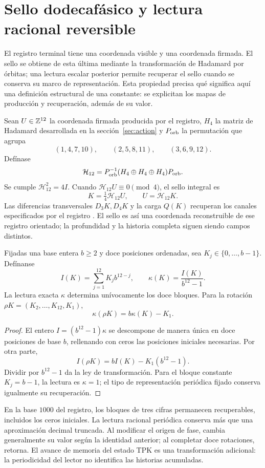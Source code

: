 \section{Sello dodecafásico y lectura racional reversible}
\label{sec:sello}

El registro terminal tiene una coordenada visible y una coordenada
firmada. El sello se obtiene de esta última mediante la transformación
de Hadamard por órbitas; una lectura escalar posterior permite recuperar
el sello cuando se conserva su marco de representación. Esta propiedad
precisa qué significa aquí una definición estructural de una constante:
se explicitan los mapas de producción y recuperación, además de su valor.

Sean $U\in\mathbb Z^{12}$ la coordenada firmada producida por el registro,
$H_4$ la matriz de Hadamard desarrollada en la sección~\ref{sec:action}
y $P_{\rm orb}$ la permutación que agrupa
\[
 (1,4,7,10),\qquad(2,5,8,11),\qquad(3,6,9,12).
\]
Defínase
\[
 \mathcal H_{12}=P_{\rm orb}^{-1}
 (H_4\oplus H_4\oplus H_4)P_{\rm orb}.
\]
Se cumple $\mathcal H_{12}^2=4I$. Cuando
$\mathcal H_{12}U\equiv0\pmod4$, el sello integral es
\[
 K=\tfrac14\mathcal H_{12}U,
 \qquad U=\mathcal H_{12}K.
\]
Las diferencias transversales $D_3K,D_4K$ y la carga $Q(K)$ recuperan
los canales especificados por el registro \cite{registro}.
El sello es así una coordenada reconstruible de ese registro orientado;
la profundidad y la historia completa siguen siendo campos distintos.

\begin{proposition}
Fijadas una base entera $b\ge2$ y doce posiciones ordenadas, sea
$K_j\in\{0,\ldots,b-1\}$. Defínanse
\[
 I(K)=\sum_{j=1}^{12}K_jb^{12-j},\qquad
 \kappa(K)=\frac{I(K)}{b^{12}-1}.
\]
La lectura exacta $\kappa$ determina unívocamente los doce bloques.
Para la rotación $\rho K=(K_2,\ldots,K_{12},K_1)$,
\[
 \boxed{\kappa(\rho K)=b\kappa(K)-K_1.}
\]
\end{proposition}
\begin{proof}
El entero $I=(b^{12}-1)\kappa$ se descompone de manera única en doce
posiciones de base $b$, rellenando con ceros las posiciones iniciales
necesarias. Por otra parte,
\[
 I(\rho K)=bI(K)-K_1(b^{12}-1).
\]
Dividir por $b^{12}-1$ da la ley de transformación. Para el bloque
constante $K_j=b-1$, la lectura es $\kappa=1$; el tipo de representación
periódica fijado conserva igualmente su recuperación.
\end{proof}

En la base $1000$ del registro, los bloques de tres cifras permanecen
recuperables, incluidos los ceros iniciales. La lectura racional
periódica conserva más que una aproximación decimal truncada.
Al modificar el origen de fase, cambia generalmente su valor según
la identidad anterior; al completar doce rotaciones, retorna.
El avance de memoria del estado TPK es una transformación adicional:
la periodicidad del lector no identifica las historias acumuladas.

